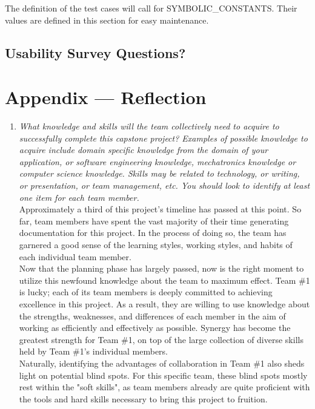 \documentclass[12pt, titlepage]{article}
\begin{document}
The definition of the test cases will call for SYMBOLIC\_CONSTANTS.
Their values are defined in this section for easy maintenance.

\subsection{Usability Survey Questions?}


\newpage{}
\section*{Appendix --- Reflection}

\begin{enumerate}
  \item \textit{What knowledge and skills will the team collectively need to acquire to
        successfully complete this capstone project?  Examples of possible knowledge
        to acquire include domain specific knowledge from the domain of your
        application, or software engineering knowledge, mechatronics knowledge or
        computer science knowledge.  Skills may be related to technology, or writing,
        or presentation, or team management, etc.  You should look to identify at
        least one item for each team member.}\\

	Approximately a third of this project's timeline has passed at this point. So far, team members have spent the vast majority of their time generating documentation for this project. In the process of doing so, the team has garnered a good sense of the learning styles, working styles, and habits of each individual team member.\\

Now that the planning phase has largely passed, now is the right moment to utilize this newfound knowledge about the team to maximum effect. Team \#1 is lucky; each of its team members is deeply committed to achieving excellence in this project. As a result, they are willing to use knowledge about the strengths, weaknesses, and differences of each member in the aim of working as efficiently and effectively as possible. Synergy has become the greatest strength for Team \#1, on top of the large collection of diverse skills held by Team \#1's individual members.\\

Naturally, identifying the advantages of collaboration in Team \#1 also sheds light on potential blind spots. For this specific team, these blind spots mostly rest within the "soft skills", as team members already are quite proficient with the tools and hard skills necessary to bring this project to fruition.\\


\end{enumerate}
\end{document}
